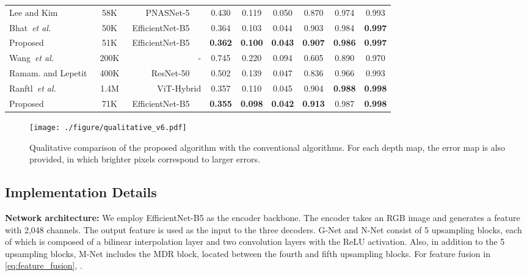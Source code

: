 \documentclass[runningheads]{llncs}
\newcommand{\etal}{\textit{et al.}}
\begin{document}
\begin{table}[!t]
\begin{tabular}{l|c|r|cccccc}
    \multicolumn{1}{l|}{Lee and Kim~\cite{lee2020multi}} & 58K & PNASNet-5~\cite{liu2018progressive} \ & 0.430 & 0.119 & 0.050 & 0.870 & 0.974 & 0.993\\
    \multicolumn{1}{l|}{Bhat~\etal~\cite{bhat2021adabins}} & 50K & \ EfficientNet-B5~\cite{tan2019efficientnet} \ & 0.364 & 0.103 & 0.044 & 0.903 & 0.984 & \textbf{0.997}\\
    \multicolumn{1}{l|}{Proposed} & 51K & EfficientNet-B5~\cite{tan2019efficientnet} \ & \textbf{0.362} & \textbf{0.100} & \textbf{0.043} & \textbf{0.907} & \textbf{0.986} & \textbf{0.997}\\
    \midrule\midrule
    \multicolumn{1}{l|}{Wang~\etal~\cite{wang2015towards}} & 200K & - \hspace{1cm} & 0.745 & 0.220 & 0.094 & 0.605 & 0.890 & 0.970\\
    \multicolumn{1}{l|}{Ramam. and Lepetit~\cite{ramamonjisoa2019sharpnet}} & 400K & ResNet-50~\cite{he2016deep} \ & 0.502 & 0.139 & 0.047 & 0.836 & 0.966 & 0.993\\
    \multicolumn{1}{l|}{Ranftl~\etal~\cite{ranftl2021vision}} & 1.4M & ViT-Hybrid{\hskip 0.5em}~\cite{dosovitskiy2020image} \ & 0.357 & 0.110 & 0.045 & 0.904 & \textbf{0.988} & \textbf{0.998}\\
    \multicolumn{1}{l|}{Proposed} & 71K & EfficientNet-B5~\cite{tan2019efficientnet} \ & \textbf{0.355} & \textbf{0.098} & \textbf{0.042} & \textbf{0.913} & 0.987 & \textbf{0.998}\\
    \bottomrule
    \end{tabular}
    \label{tb:performance_NYU}
\end{table}

\begin{figure}[!t]
  \centering
   \texttt{[image: ./figure/qualitative\_v6.pdf]}
   \caption{
   Qualitative comparison of the proposed algorithm with the conventional algorithms. For each depth map, the error map is also provided, in which brighter pixels correspond to larger errors.
   }
   \label{fig:qualitative}
\end{figure}


\subsection{Implementation Details}
{\noindent \bf Network architecture:} We employ EfficientNet-B5 \cite{tan2019efficientnet} as the encoder backbone. The encoder takes an  RGB image and generates a  feature with 2,048 channels. The output feature is used as the input to the three decoders. G-Net and N-Net consist of 5 upsampling blocks, each of which is composed of a bilinear interpolation layer and two  convolution layers with the ReLU activation. Also, in addition to the 5 upsampling blocks, M-Net includes the MDR block, located between the fourth and fifth upsampling blocks. For feature fusion in \eqref{eq:feature_fusion}, .
\end{document}
